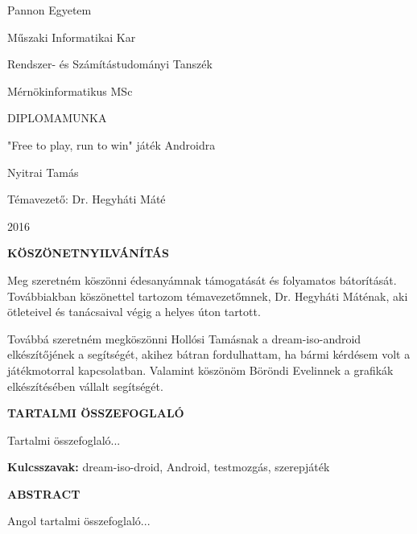 \documentclass[a4paper,oneside,10pt]{report}
\begin{document}
\begin{titlepage}
\begin{center}
\Large
Pannon Egyetem

\vspace{10mm}
Műszaki Informatikai Kar

\vspace{10mm}
Rendszer- és Számítástudományi Tanszék

\vspace{10mm}
Mérnökinformatikus MSc

\vspace{40mm}
\huge
DIPLOMAMUNKA

\vspace{10mm}
\LARGE
"Free to play, run to win" játék Androidra

\vspace{10mm}
\Large
Nyitrai Tamás

\vspace{40mm}
Témavezető: Dr. Hegyháti Máté

\vspace{10mm}
2016
\normalsize
\end{center}
\end{titlepage}



\pagestyle{empty} %



\newpage
\Large
\begin{center}
	\textbf{KÖSZÖNETNYILVÁNÍTÁS}
\end{center}
\normalsize
\noindent
Meg szeretném köszönni édesanyámnak támogatását és folyamatos bátorítását. Továbbiakban köszönettel tartozom témavezetőmnek, Dr. Hegyháti Máténak, aki ötleteivel és tanácsaival végig a helyes úton tartott.

Továbbá szeretném megköszönni Hollósi Tamásnak a dream-iso-android elkészítőjének a segítségét, akihez bátran fordulhattam, ha bármi kérdésem volt a játékmotorral kapcsolatban. Valamint köszönöm Böröndi Evelinnek a grafikák elkészítésében vállalt segítségét.
\newpage
\Large
\begin{center}
	\textbf{TARTALMI ÖSSZEFOGLALÓ}
\end{center}
\normalsize
\noindent


Tartalmi összefoglaló...

\textbf{Kulcsszavak:} dream-iso-droid, Android, testmozgás, szerepjáték

\newpage

\Large
\begin{center}
	\textbf{ABSTRACT}
\end{center}
\normalsize
\noindent
Angol tartalmi összefoglaló...
\end{document}
